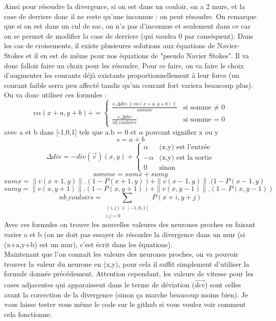 \documentclass[12pt]{article}
\begin{document}
Ainsi pour résoudre la divergence, si on est dans un couloir, on a 2 murs, et la case de derriere donc il ne reste qu'une inconnue : on peut résoudre. On remarque que si on est dans un cul de sac, on n'a pas d'inconnue et seulement dans ce cas on se permet de modifier la case de derriere (qui vaudra 0 par conséquent). Dans les cas de croisements, il existe plusieures solutions aux équations de Navier-Stokes et il en est de même pour nos équations de "pseudo Navier Stokes". Il va donc falloir faire un choix pour les résoudre. Pour ce faire, on va faire le choix d'augmenter les courants déjà existants proportionnellement à leur force (un courant faible serra peu affecté tandis qu'un courant fort variera beaucoup plus). On va donc utiliser ces formules :
\[v\alpha(x+a,y+b) += 
\begin{cases}
	\frac{s.\Delta div.\|v\alpha(x+a,y+b)\|}{somme} & \text{si somme $\neq$ 0} \\
	\frac{s.\Delta div}{nb\_couloirs} & \text{si somme = 0}
\end{cases}
\]
avec a et b dans [-1,0,1] tels que a.b = 0 et $\alpha$ pouvant signifier x ou y
\[s = a+b\]
\[\Delta div = - div(\overrightarrow{v})(x,y) +
\begin{cases}
	\alpha & \text{(x,y) est l'entrée} \\
	-\alpha & \text{(x,y) est la sortie} \\
	0 & \text{sinon}
\end{cases}
\]
\[somme = sumx + sumy \]
\[sumx = \|v(x+1,y)\|.(1-P(x+1,y))+\|v(x-1,y)\|.(1-P(x-1,y)\]
\[sumy = \|v(x,y+1)\|.(1-P(x,y+1))+\|v(x,y-1)\|.(1-P(x,y-1)) \]
\[nb\_couloirs = \sum_{\substack{(i,j)\in[-1,0,1]\\i.j=0}}{P(x+i,y+j)}\]
Avec ces formules on trouve les nouvelles valeures des neurones proches en faisant varier a et b (on ne doit pas essayer de résoudre la divergence dans un mur (si (x+a,y+b) est un mur), c'est écrit dans les équations). \\
Maintenant que l'on connait les valeurs des neurones proches, on va pouvoir trouver la valeur du neurone en (x,y), pour cela il suffit simplement d'utiliser la formule donnée précédement. Attention cependant, les valeurs de vitesse pour les cases adjacentes qui apparaissent dans le terme de déviation ($\overrightarrow{dev}$) sont celles avant la correction de la divergence (sinon ça marche beaucoup moins bien).
Je vous laisse tester vous même le code sur le github si vous voulez voir comment cela fonctionne.
\end{document}
